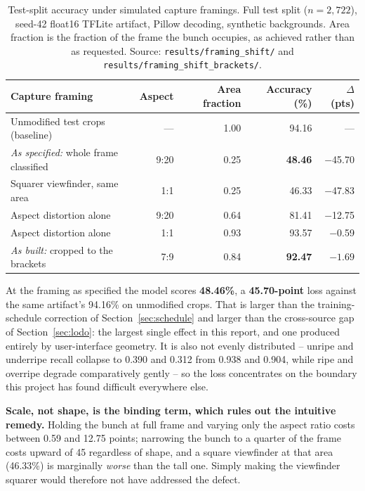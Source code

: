 \documentclass{article}
\begin{document}
\begin{table}[t]
\centering
\caption{Test-split accuracy under simulated capture framings. Full test split ($n{=}2{,}722$), seed-42
float16 TFLite artifact, Pillow decoding, synthetic backgrounds. Area fraction is the fraction of the
frame the bunch occupies, as achieved rather than as requested. Source:
\texttt{results/framing\_shift/} and \texttt{results/framing\_shift\_brackets/}.}
\label{tab:framing}
\begin{tabular}{@{}lrrrr@{}}
\toprule
Capture framing & Aspect & Area fraction & Accuracy (\%) & $\Delta$ (pts) \\
\midrule
Unmodified test crops (baseline) & --- & 1.00 & 94.16 & --- \\
\midrule
\textit{As specified:} whole frame classified & 9:20 & 0.25 & \textbf{48.46} & $-$45.70 \\
Squarer viewfinder, same area & 1:1 & 0.25 & 46.33 & $-$47.83 \\
Aspect distortion alone & 9:20 & 0.64 & 81.41 & $-$12.75 \\
Aspect distortion alone & 1:1 & 0.93 & 93.57 & $-$0.59 \\
\midrule
\textit{As built:} cropped to the brackets & 7:9 & 0.84 & \textbf{92.47} & $\mathbf{-1.69}$ \\
\bottomrule
\end{tabular}
\end{table}

At the framing as specified the model scores \textbf{48.46\%}, a \textbf{45.70-point} loss against the
same artifact's 94.16\% on unmodified crops. That is larger than the training-schedule correction of
Section~\ref{sec:schedule} and larger than the cross-source gap of Section~\ref{sec:lodo}: the largest
single effect in this report, and one produced entirely by user-interface geometry. It is also not
evenly distributed -- unripe and underripe recall collapse to 0.390 and 0.312 from 0.938 and 0.904, while
ripe and overripe degrade comparatively gently -- so the loss concentrates on the boundary this project
has found difficult everywhere else.

\textbf{Scale, not shape, is the binding term, which rules out the intuitive remedy.} Holding the bunch at
full frame and varying only the aspect ratio costs between 0.59 and 12.75 points; narrowing the bunch to a
quarter of the frame costs upward of 45 regardless of shape, and a square viewfinder at that area
(46.33\%) is marginally \textit{worse} than the tall one. Simply making the viewfinder squarer would
therefore not have addressed the defect.
\end{document}
